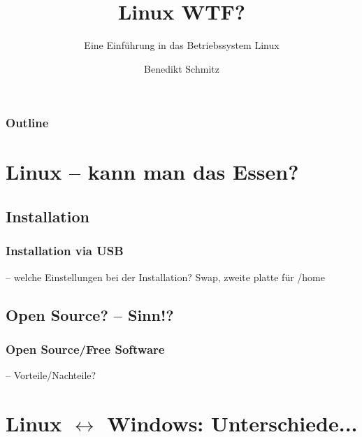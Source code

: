 \documentclass{beamer}
\begin{document}
\title{Linux WTF?}
\subtitle{Eine Einführung in das Betriebssystem Linux}
\author{Benedikt Schmitz}
\date{}



	\begin{frame}[plain]
	  \titlepage
	\end{frame}
	\begin{frame}
  		\frametitle{Outline}
		\tableofcontents
	\end{frame}
	\section{Linux -- kann man das Essen?}
	    \subsection{Installation}
	        \begin{frame}
          		\frametitle{Installation via USB}
          		-- welche Einstellungen bei der Installation? Swap, zweite platte für /home
        		\begin{minipage}{0.44\textwidth}
        		
        		\end{minipage}%
        		\begin{minipage}{0.54\textwidth}
        		
        		\end{minipage}
        	\end{frame}
        	
	    \subsection{Open Source? -- Sinn!?}
	        \begin{frame}
          		\frametitle{Open Source/Free Software}
          		-- Vorteile/Nachteile?
        		\begin{minipage}{0.44\textwidth}
        		
        		\end{minipage}%
        		\begin{minipage}{0.54\textwidth}
        		
        		\end{minipage}
        	\end{frame}
        	
    \section{Linux $\leftrightarrow$ Windows: Unterschiede...}
\end{document}
